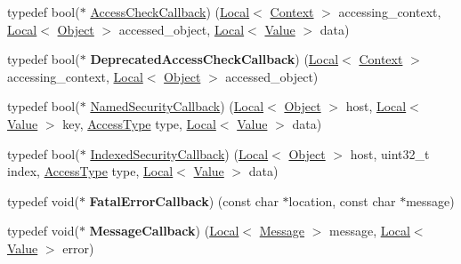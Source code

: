 \begin{DoxyCompactItemize}
\item 
typedef bool($\ast$ \hyperlink{namespacev8_a1024fb358d107c1494163217830688e6}{Access\+Check\+Callback}) (\hyperlink{classv8_1_1_local}{Local}$<$ \hyperlink{classv8_1_1_context}{Context} $>$ accessing\+\_\+context, \hyperlink{classv8_1_1_local}{Local}$<$ \hyperlink{classv8_1_1_object}{Object} $>$ accessed\+\_\+object, \hyperlink{classv8_1_1_local}{Local}$<$ \hyperlink{classv8_1_1_value}{Value} $>$ data)
\item 
typedef bool($\ast$ {\bfseries Deprecated\+Access\+Check\+Callback}) (\hyperlink{classv8_1_1_local}{Local}$<$ \hyperlink{classv8_1_1_context}{Context} $>$ accessing\+\_\+context, \hyperlink{classv8_1_1_local}{Local}$<$ \hyperlink{classv8_1_1_object}{Object} $>$ accessed\+\_\+object)\hypertarget{namespacev8_a26a50b38ae59fa451377ad1c32d2e6e6}{}\label{namespacev8_a26a50b38ae59fa451377ad1c32d2e6e6}

\item 
typedef bool($\ast$ \hyperlink{namespacev8_ab5cafda0c556bba990c660ce9c904e0d}{Named\+Security\+Callback}) (\hyperlink{classv8_1_1_local}{Local}$<$ \hyperlink{classv8_1_1_object}{Object} $>$ host, \hyperlink{classv8_1_1_local}{Local}$<$ \hyperlink{classv8_1_1_value}{Value} $>$ key, \hyperlink{namespacev8_add8bef6469c5b94706584124e610046c}{Access\+Type} type, \hyperlink{classv8_1_1_local}{Local}$<$ \hyperlink{classv8_1_1_value}{Value} $>$ data)
\item 
typedef bool($\ast$ \hyperlink{namespacev8_aebbcc7837753e51112d944ad96520da1}{Indexed\+Security\+Callback}) (\hyperlink{classv8_1_1_local}{Local}$<$ \hyperlink{classv8_1_1_object}{Object} $>$ host, uint32\+\_\+t index, \hyperlink{namespacev8_add8bef6469c5b94706584124e610046c}{Access\+Type} type, \hyperlink{classv8_1_1_local}{Local}$<$ \hyperlink{classv8_1_1_value}{Value} $>$ data)
\item 
typedef void($\ast$ {\bfseries Fatal\+Error\+Callback}) (const char $\ast$location, const char $\ast$message)\hypertarget{namespacev8_abc93f69508701f18dc5cc0ce165616aa}{}\label{namespacev8_abc93f69508701f18dc5cc0ce165616aa}

\item 
typedef void($\ast$ {\bfseries Message\+Callback}) (\hyperlink{classv8_1_1_local}{Local}$<$ \hyperlink{classv8_1_1_message}{Message} $>$ message, \hyperlink{classv8_1_1_local}{Local}$<$ \hyperlink{classv8_1_1_value}{Value} $>$ error)\hypertarget{namespacev8_a871380126ff63a699e78cb83d8d613a6}{}\label{namespacev8_a871380126ff63a699e78cb83d8d613a6}


\end{DoxyCompactItemize}
